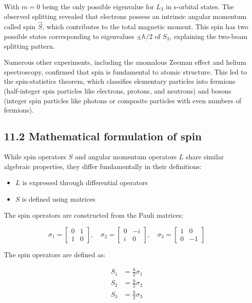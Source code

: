 \documentclass[italian]{HKNdocument}
\begin{document}
With $m=0$ being the only possible eigenvalue for $L_3$ in s-orbital states. The observed splitting revealed that electrons possess an intrinsic angular momentum called spin $\vec{S}$, which contributes to the total magnetic moment. This spin has two possible states corresponding to eigenvalues $\pm\hbar/2$ of $S_3$, explaining the two-beam splitting pattern.

Numerous other experiments, including the anomalous Zeeman effect and helium spectroscopy, confirmed that spin is fundamental to atomic structure. This led to the spin-statistics theorem, which classifies elementary particles into fermions (half-integer spin particles like electrons, protons, and neutrons) and bosons (integer spin particles like photons or composite particles with even numbers of fermions).

\subsection*{11.2 Mathematical formulation of spin}
While spin operators $S$ and angular momentum operators $L$ share similar algebraic properties, they differ fundamentally in their definitions:

\begin{itemize}
  \item $L$ is expressed through differential operators
  \item $S$ is defined using matrices
\end{itemize}

The spin operators are constructed from the Pauli matrices:

\[
\sigma_{1}=\left[\begin{array}{ll}
0 & 1  \tag{11.4}\\
1 & 0
\end{array}\right], \quad \sigma_{2}=\left[\begin{array}{cc}
0 & -i \\
i & 0
\end{array}\right], \quad \sigma_{3}=\left[\begin{array}{cc}
1 & 0 \\
0 & -1
\end{array}\right]
\]

The spin operators are defined as:

\begin{align*}
S_{1} & =\frac{\hbar}{2} \sigma_{1} \\
S_{2} & =\frac{\hbar}{2} \sigma_{2}  \tag{11.5}\\
S_{3} & =\frac{\hbar}{2} \sigma_{3}
\end{align*}
\end{document}
